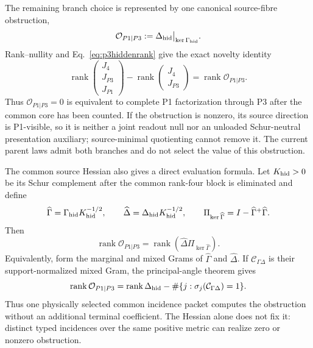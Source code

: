 \documentclass[11pt]{article}
\begin{document}
The remaining branch choice is represented by one canonical source-fibre
obstruction,
\begin{equation}
\mathcal O_{P1|P3}
:=\Delta_{\rm hid}\big|_{\ker\Gamma_{\rm hid}} .
\label{eq:p3obstruction}
\end{equation}
Rank--nullity and Eq.~\eqref{eq:p3hiddenrank} give the exact novelty identity
\begin{equation}
\boxed{
\operatorname{rank}
\begin{pmatrix}J_4\\J_{P3}\\J_{P1}\end{pmatrix}
-
\operatorname{rank}
\begin{pmatrix}J_4\\J_{P3}\end{pmatrix}
=\operatorname{rank}\mathcal O_{P1|P3}.}
\label{eq:p3obstructionrank}
\end{equation}
Thus $\mathcal O_{P1|P3}=0$ is equivalent to complete P1 factorization through
P3 after the common core has been counted.  If the obstruction is nonzero,
its source direction is P1-visible, so it is neither a joint readout null nor
an unloaded Schur-neutral presentation auxiliary; source-minimal quotienting
cannot remove it.  The current parent laws admit both branches and do not
select the value of this obstruction.

The common source Hessian also gives a direct evaluation formula.  Let
$K_{\rm hid}>0$ be its Schur complement after the common rank-four block is
eliminated and define
\begin{equation}
\widehat\Gamma=\Gamma_{\rm hid}K_{\rm hid}^{-1/2},\qquad
\widehat\Delta=\Delta_{\rm hid}K_{\rm hid}^{-1/2},\qquad
\Pi_{\ker\widehat\Gamma}=I-\widehat\Gamma^+\widehat\Gamma .
\end{equation}
Then
\begin{equation}
\boxed{\operatorname{rank}\mathcal O_{P1|P3}
=\operatorname{rank}
\left(\widehat\Delta\Pi_{\ker\widehat\Gamma}\right).}
\label{eq:p3obstructionprojector}
\end{equation}
Equivalently, form the marginal and mixed Grams of $\widehat\Gamma$ and
$\widehat\Delta$.  If $\mathcal C_{\Gamma\Delta}$ is their support-normalized
mixed Gram, the principal-angle theorem gives
\begin{equation}
\operatorname{rank}\mathcal O_{P1|P3}
=\operatorname{rank}\Delta_{\rm hid}
-\#\{j:\sigma_j(\mathcal C_{\Gamma\Delta})=1\}.
\label{eq:p3obstructiongram}
\end{equation}
Thus one physically selected common incidence packet computes the obstruction
without an additional terminal coefficient.  The Hessian alone does not fix
it: distinct typed incidences over the same positive metric can realize zero
or nonzero obstruction.
\end{document}
